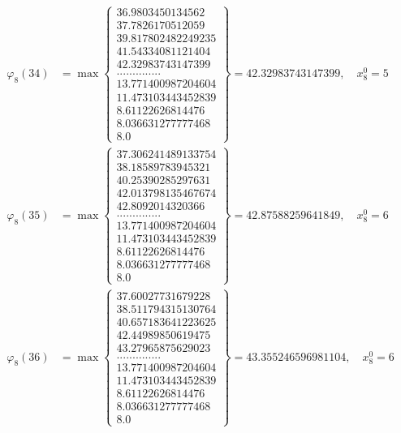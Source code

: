 \documentclass{article}
\begin{document}
\begin{align*}
  
  
  
\varphi_{8}(34) &= \max \left\{ \begin{array}{c}
36.9803450134562 \\
 37.7826170512059 \\
 39.817802482249235 \\
 41.54334081121404 \\
 42.32983743147399 \\
 .............. \\
 13.771400987204604 \\
 11.473103443452839 \\
 8.61122626814476 \\
 8.036631277777468 \\
 8.0
\end{array} \right\} = 42.32983743147399, \quad x_{8}^0 = 5\\
  
  
  
  
\varphi_{8}(35) &= \max \left\{ \begin{array}{c}
37.306241489133754 \\
 38.18589783945321 \\
 40.25390285297631 \\
 42.013798135467674 \\
 42.8092014320366 \\
 .............. \\
 13.771400987204604 \\
 11.473103443452839 \\
 8.61122626814476 \\
 8.036631277777468 \\
 8.0
\end{array} \right\} = 42.87588259641849, \quad x_{8}^0 = 6\\
  
  
  
  
\varphi_{8}(36) &= \max \left\{ \begin{array}{c}
37.60027731679228 \\
 38.511794315130764 \\
 40.657183641223625 \\
 42.44989850619475 \\
 43.27965875629023 \\
 .............. \\
 13.771400987204604 \\
 11.473103443452839 \\
 8.61122626814476 \\
 8.036631277777468 \\
 8.0
\end{array} \right\} = 43.355246596981104, \quad x_{8}^0 = 6\\
  
  
\end{align*}
\end{document}
